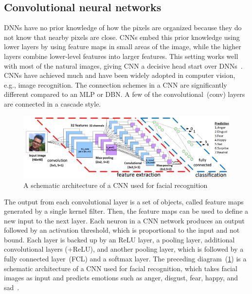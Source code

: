 \subsection{Convolutional neural networks}
DNNs have no prior knowledge of how the pixels are organized because they do not know that nearby pixels are close. CNNs embed this prior knowledge using lower layers by using feature maps in small areas of the image, while the higher layers combine lower-level features into larger features. This setting works well with most of the natural images, giving CNN a decisive head start over DNNs~\cite{karimIoT2019}. CNNs have achieved much and have been widely adopted in computer vision, e.g., image recognition. The connection schemes in a CNN are significantly different compared to an MLP or DBN. A few of the convolutional~(conv) layers are connected in a cascade style. 

\begin{figure}[h]
    \centering
    \includegraphics[scale=0.6]{images/cnn.png}
    \caption[A schematic architecture of a CNN used for facial recognition]{A schematic architecture of a CNN used for facial recognition~\cite{karim2017predictive,zaccone2018deep}}
    \label{fig:cnn_theory1}
\end{figure}

\hspace*{3.5mm} The output from each convolutional layer is a set of objects, called feature maps generated by a single kernel filter. Then, the feature maps can be used to define a new input to the next layer. Each neuron in a CNN network produces an output followed by an activation threshold, which is proportional to the input and not bound. Each layer is backed up by an ReLU layer, a pooling layer, additional convolutional layers (+ReLU), and another pooling layer, which is followed by a fully connected layer~(FCL) and a softmax layer. The preceding diagram~(\cref{fig:cnn_theory1}) is a schematic architecture of a CNN used for facial recognition, which takes facial images as input and predicts emotions such as anger, disgust, fear, happy, and sad~\cite{karimDLTF2018}.  

